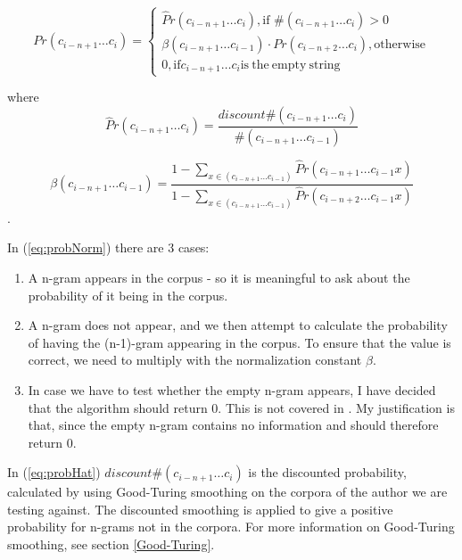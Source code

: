 \begin{equation}
\label{eq:probNorm}
Pr(c_{i - n + 1} \ldots c_{i}) = \left\{
\begin{array}{rl}
\hat{P}r(c_{i - n + 1} \ldots c_{i}), \text{if } \#(c_{i - n + 1} \ldots c_{i}) > 0\\
\beta(c_{i - n + 1} \ldots c_{i-1}) \cdot Pr(c_{i - n + 2} \ldots c_{i}), \mathrm{otherwise}\\
0, \mathrm{if} c_{i-n+1}\ldots c_i \mathrm{is\ the\ empty\ string}
\end{array} \right.
\end{equation}

where 
\begin{equation}
\label{eq:probHat}
\hat{P}r(c_{i - n + 1} \ldots c_{i}) = \frac{discount \#(c_{i - n + 1} \ldots c_{i})}{\#(c_{i - n + 1} \ldots c_{i-1})}
\end{equation}

\begin{equation}
\label{eq:beta}
\beta(c_{i - n + 1} \ldots c_{i-1}) = 
\frac
{1 - \sum_{x \in (c_{i - n + 1} \ldots c_{i-1})}\hat{P}r(c_{i - n + 1} \ldots c_{i-1} x)}
{1 - \sum_{x \in (c_{i - n + 1} \ldots c_{i-1})}\hat{P}r(c_{i - n + 2} \ldots c_{i-1} x)}
\end{equation}.

In (\ref{eq:probNorm}) there are 3 cases:
\begin{enumerate}
\item A n-gram appears in the corpus - so it is meaningful to ask about the probability of it being in the corpus.
\item  A n-gram does not appear, and we then attempt to calculate the probability of having the (n-1)-gram appearing in the corpus. To ensure that the value is correct, we need to multiply with the normalization constant $\beta$. 
\item In case we have to test whether the empty n-gram appears, I have decided that the algorithm should return 0. This is not covered in \cite{nr4}. My justification is that, since the empty n-gram contains no information and should therefore return 0.
\end{enumerate}
In (\ref{eq:probHat}) $discount\#(c_{i - n + 1} \ldots c_{i})$ 
is the discounted probability, calculated by using Good-Turing smoothing on the corpora of the author we are testing against. The discounted smoothing is applied to give a positive probability for n-grams not in the corpora. For more information on Good-Turing smoothing, see section \ref{Good-Turing}.\\


